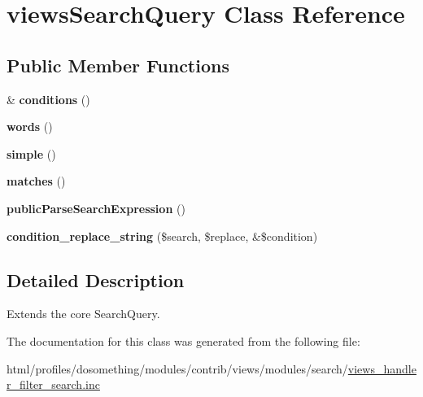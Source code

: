 \hypertarget{classviewsSearchQuery}{
\section{viewsSearchQuery Class Reference}
\label{classviewsSearchQuery}
}
\subsection*{Public Member Functions}
\begin{DoxyCompactItemize}
\item 
\hypertarget{classviewsSearchQuery_a9e059c456dbd678823b8e937be92301e}{
\& {\bfseries conditions} ()}
\label{classviewsSearchQuery_a9e059c456dbd678823b8e937be92301e}

\item 
\hypertarget{classviewsSearchQuery_a21aaa6cd96d24312604fe3e0daaed96b}{
{\bfseries words} ()}
\label{classviewsSearchQuery_a21aaa6cd96d24312604fe3e0daaed96b}

\item 
\hypertarget{classviewsSearchQuery_a7f59df9f3118f5bc9de9c181991ab701}{
{\bfseries simple} ()}
\label{classviewsSearchQuery_a7f59df9f3118f5bc9de9c181991ab701}

\item 
\hypertarget{classviewsSearchQuery_ae4e6c0397175474bf55e27b201a66930}{
{\bfseries matches} ()}
\label{classviewsSearchQuery_ae4e6c0397175474bf55e27b201a66930}

\item 
\hypertarget{classviewsSearchQuery_ac35ea99a8c946881f580cd17cc6b9244}{
{\bfseries publicParseSearchExpression} ()}
\label{classviewsSearchQuery_ac35ea99a8c946881f580cd17cc6b9244}

\item 
\hypertarget{classviewsSearchQuery_a3857365d4f50db7c8f29c384272d4dea}{
{\bfseries condition\_\-replace\_\-string} (\$search, \$replace, \&\$condition)}
\label{classviewsSearchQuery_a3857365d4f50db7c8f29c384272d4dea}

\end{DoxyCompactItemize}


\subsection{Detailed Description}
Extends the core SearchQuery. 

The documentation for this class was generated from the following file:\begin{DoxyCompactItemize}
\item 
html/profiles/dosomething/modules/contrib/views/modules/search/\hyperlink{views__handler__filter__search_8inc}{views\_\-handler\_\-filter\_\-search.inc}\end{DoxyCompactItemize}
